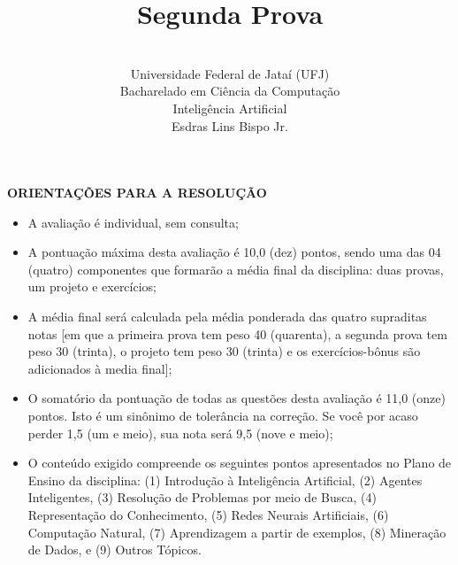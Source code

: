 \documentclass[12pt,a4paper,oneside]{article}
\author{\\Universidade Federal de Jataí (UFJ)\\Bacharelado em Ciência da Computação \\Inteligência Artificial \\Esdras Lins Bispo Jr.}
\title{\sc \huge Segunda Prova}
\begin{document}
\maketitle

{\bf ORIENTAÇÕES PARA A RESOLUÇÃO}

\begin{itemize}
	\item A avaliação é individual, sem consulta;
	\item A pontuação máxima desta avaliação é 10,0 (dez) pontos, sendo uma das 04 (quatro) componentes que formarão a média final da disciplina: duas provas, um projeto e exercícios;
	\item A média final será calculada pela média ponderada das quatro supraditas notas [em que a primeira prova tem peso 40 (quarenta), a segunda prova tem peso 30 (trinta), o projeto tem peso 30 (trinta) e os exercícios-bônus são adicionados à media final];
	\item O somatório da pontuação de todas as questões desta avaliação é 11,0 (onze) pontos. Isto é um sinônimo de tolerância na correção. Se você por acaso perder 1,5 (um e meio), sua nota será 9,5 (nove e meio);
	\item O conteúdo exigido compreende os seguintes pontos apresentados no Plano de Ensino da disciplina: (1) Introdução à Inteligência Artificial, (2) Agentes Inteligentes, (3) Resolução de Problemas por meio de Busca, (4) Representação do Conhecimento, (5) Redes Neurais Artificiais, (6) Computação Natural, (7) Aprendizagem a partir de exemplos, (8) Mine\-ração de Dados, e (9) Outros Tópicos.
\end{itemize}

\begin{center}
\end{center}

\newpage
\end{document}
